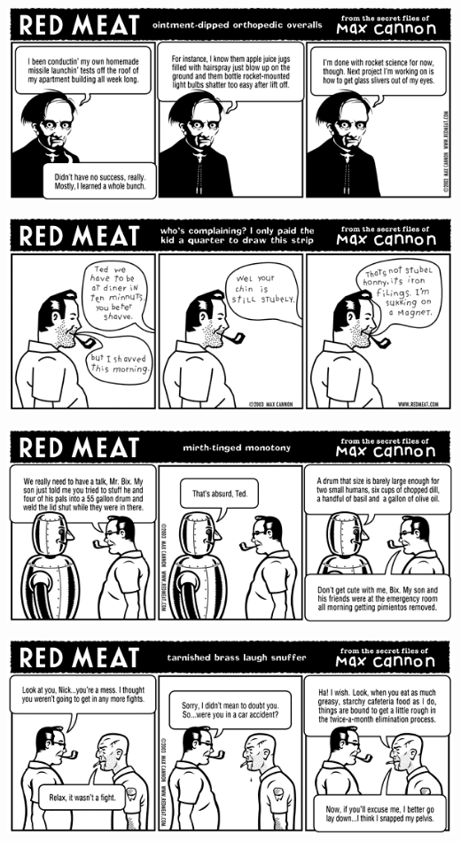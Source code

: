 \documentclass[a4paper,twoside,11pt]{article}
\begin{document}
\includegraphics[width=\textwidth]{redmeat_2003-04-15.png}



\includegraphics[width=\textwidth]{redmeat_2003-04-22.png}



\includegraphics[width=\textwidth]{redmeat_2003-04-29.png}



\includegraphics[width=\textwidth]{redmeat_2003-05-06.png}
\end{document}
